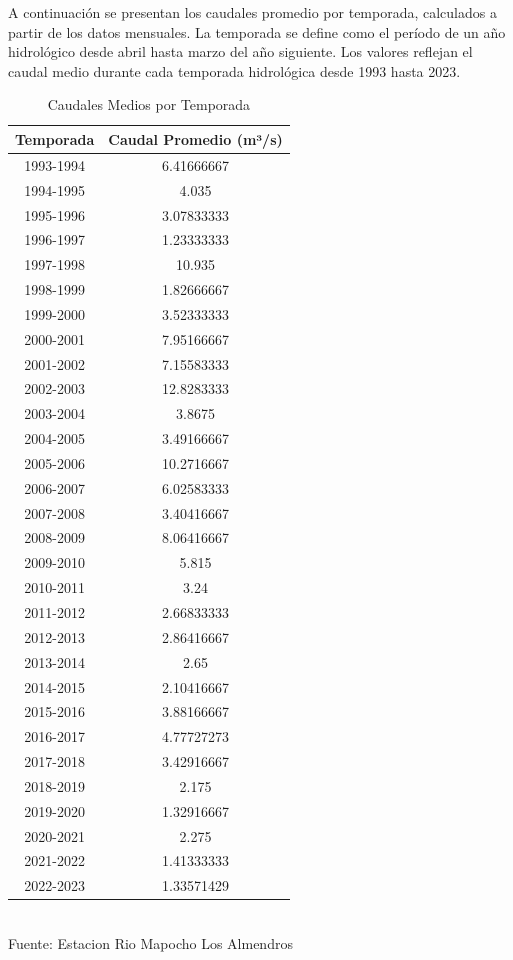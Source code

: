 \documentclass{article} %
\begin{document}
A continuación se presentan los caudales promedio por temporada, calculados a partir de los datos mensuales. La temporada se define como el período de un año hidrológico desde abril hasta marzo del año siguiente. Los valores reflejan el caudal medio durante cada temporada hidrológica desde 1993 hasta 2023.

\begin{table}[H]
    \centering
    \small %
    \caption{Caudales Medios por Temporada}
    \vspace{0.2cm}
    \begin{tabular}{|c|c|}
        \hline
        \textbf{Temporada} & \textbf{Caudal Promedio (m³/s)} \\
        \hline
        1993-1994 & 6.41666667 \\
        1994-1995 & 4.035 \\
        1995-1996 & 3.07833333 \\
        1996-1997 & 1.23333333 \\
        1997-1998 & 10.935 \\
        1998-1999 & 1.82666667 \\
        1999-2000 & 3.52333333 \\
        2000-2001 & 7.95166667 \\
        2001-2002 & 7.15583333 \\
        2002-2003 & 12.8283333 \\
        2003-2004 & 3.8675 \\
        2004-2005 & 3.49166667 \\
        2005-2006 & 10.2716667 \\
        2006-2007 & 6.02583333 \\
        2007-2008 & 3.40416667 \\
        2008-2009 & 8.06416667 \\
        2009-2010 & 5.815 \\
        2010-2011 & 3.24 \\
        2011-2012 & 2.66833333 \\
        2012-2013 & 2.86416667 \\
        2013-2014 & 2.65 \\
        2014-2015 & 2.10416667 \\
        2015-2016 & 3.88166667 \\
        2016-2017 & 4.77727273 \\
        2017-2018 & 3.42916667 \\
        2018-2019 & 2.175 \\
        2019-2020 & 1.32916667 \\
        2020-2021 & 2.275 \\
        2021-2022 & 1.41333333 \\
        2022-2023 & 1.33571429 \\
        \hline
    \end{tabular}
    \label{tab:caudales_temporada}
    \vspace{0.2cm}
    \\Fuente: Estacion Rio Mapocho Los Almendros
\end{table}
\end{document}
